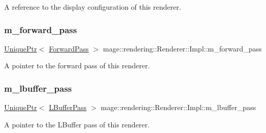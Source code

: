 A reference to the display configuration of this renderer. \hypertarget{classmage_1_1rendering_1_1_renderer_1_1_impl_aa62d3e015ddcc7b48d423ad0e55a82d7}{}\label{classmage_1_1rendering_1_1_renderer_1_1_impl_aa62d3e015ddcc7b48d423ad0e55a82d7} 
\subsubsection{\texorpdfstring{m\+\_\+forward\+\_\+pass}{m\_forward\_pass}}
{\footnotesize\ttfamily \hyperlink{namespacemage_a3316d7143a973e37adf1110f2e80ca31}{Unique\+Ptr}$<$ \hyperlink{classmage_1_1rendering_1_1_forward_pass}{Forward\+Pass} $>$ mage\+::rendering\+::\+Renderer\+::\+Impl\+::m\+\_\+forward\+\_\+pass\hspace{0.3cm}{\ttfamily [private]}}

A pointer to the forward pass of this renderer. \hypertarget{classmage_1_1rendering_1_1_renderer_1_1_impl_a82455409a99a11e84de943181138e33e}{}\label{classmage_1_1rendering_1_1_renderer_1_1_impl_a82455409a99a11e84de943181138e33e} 
\subsubsection{\texorpdfstring{m\+\_\+lbuffer\+\_\+pass}{m\_lbuffer\_pass}}
{\footnotesize\ttfamily \hyperlink{namespacemage_a3316d7143a973e37adf1110f2e80ca31}{Unique\+Ptr}$<$ \hyperlink{classmage_1_1rendering_1_1_l_buffer_pass}{L\+Buffer\+Pass} $>$ mage\+::rendering\+::\+Renderer\+::\+Impl\+::m\+\_\+lbuffer\+\_\+pass\hspace{0.3cm}{\ttfamily [private]}}

A pointer to the L\+Buffer pass of this renderer. \hypertarget{classmage_1_1rendering_1_1_renderer_1_1_impl_a177cc2fc2cab6c39fc26046e1bea8b97}{}\label{classmage_1_1rendering_1_1_renderer_1_1_impl_a177cc2fc2cab6c39fc26046e1bea8b97} 
